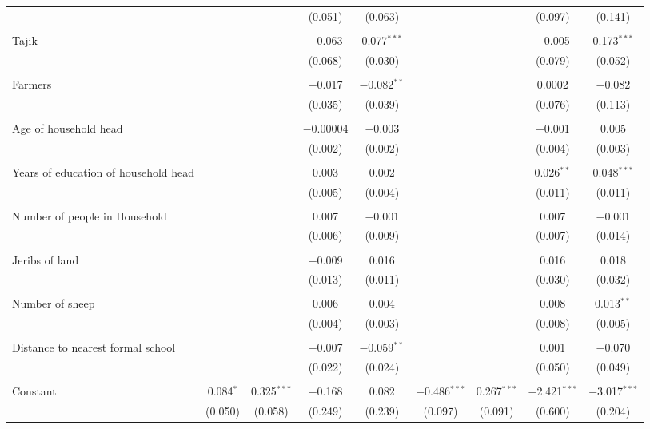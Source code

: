 \documentclass[
]{article}
\begin{document}
\begin{table}[!htbp]
\begin{tabular}{@{\extracolsep{-15pt}}lcccccccc}
  &  &  & (0.051) & (0.063) &  &  & (0.097) & (0.141) \\ 
  & & & & & & & & \\ 
 Tajik &  &  & $-$0.063 & 0.077$^{***}$ &  &  & $-$0.005 & 0.173$^{***}$ \\ 
  &  &  & (0.068) & (0.030) &  &  & (0.079) & (0.052) \\ 
  & & & & & & & & \\ 
 Farmers &  &  & $-$0.017 & $-$0.082$^{**}$ &  &  & 0.0002 & $-$0.082 \\ 
  &  &  & (0.035) & (0.039) &  &  & (0.076) & (0.113) \\ 
  & & & & & & & & \\ 
 Age of household head &  &  & $-$0.00004 & $-$0.003 &  &  & $-$0.001 & 0.005 \\ 
  &  &  & (0.002) & (0.002) &  &  & (0.004) & (0.003) \\ 
  & & & & & & & & \\ 
 Years of education of household head &  &  & 0.003 & 0.002 &  &  & 0.026$^{**}$ & 0.048$^{***}$ \\ 
  &  &  & (0.005) & (0.004) &  &  & (0.011) & (0.011) \\ 
  & & & & & & & & \\ 
 Number of people in Household &  &  & 0.007 & $-$0.001 &  &  & 0.007 & $-$0.001 \\ 
  &  &  & (0.006) & (0.009) &  &  & (0.007) & (0.014) \\ 
  & & & & & & & & \\ 
 Jeribs of land &  &  & $-$0.009 & 0.016 &  &  & 0.016 & 0.018 \\ 
  &  &  & (0.013) & (0.011) &  &  & (0.030) & (0.032) \\ 
  & & & & & & & & \\ 
 Number of sheep &  &  & 0.006 & 0.004 &  &  & 0.008 & 0.013$^{**}$ \\ 
  &  &  & (0.004) & (0.003) &  &  & (0.008) & (0.005) \\ 
  & & & & & & & & \\ 
 Distance to nearest formal school &  &  & $-$0.007 & $-$0.059$^{**}$ &  &  & 0.001 & $-$0.070 \\ 
  &  &  & (0.022) & (0.024) &  &  & (0.050) & (0.049) \\ 
  & & & & & & & & \\ 
 Constant & 0.084$^{*}$ & 0.325$^{***}$ & $-$0.168 & 0.082 & $-$0.486$^{***}$ & 0.267$^{***}$ & $-$2.421$^{***}$ & $-$3.017$^{***}$ \\ 
  & (0.050) & (0.058) & (0.249) & (0.239) & (0.097) & (0.091) & (0.600) & (0.204) \\ 

\end{tabular}
\end{table}
\end{document}

